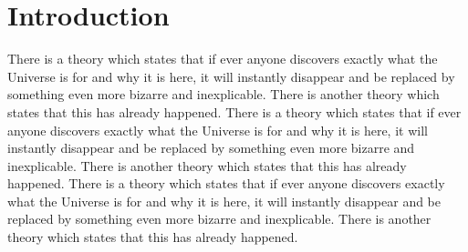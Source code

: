 \section{Introduction}
    There is a theory which states that if ever anyone discovers 
    exactly what the Universe is for and why it is here, 
    it will instantly disappear and be replaced by something even more bizarre and inexplicable.
    There is another theory which states that this has already happened.
    \citep{adams1995hitchhiker}
    There is a theory which states that if ever anyone discovers 
    exactly what the Universe is for and why it is here, 
    it will instantly disappear and be replaced by something even more bizarre and inexplicable.
    There is another theory which states that this has already happened.
    There is a theory which states that if ever anyone discovers 
    exactly what the Universe is for and why it is here, 
    it will instantly disappear and be replaced by something even more bizarre and inexplicable.
    There is another theory which states that this has already happened.
    \citep{adams1995hitchhiker2}